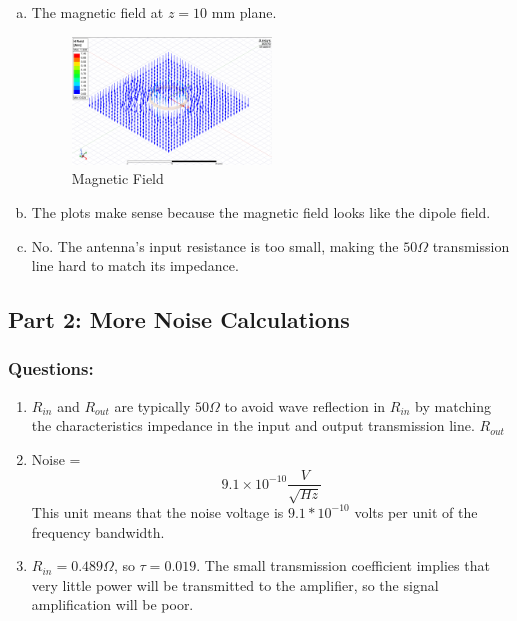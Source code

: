 \documentclass{article} %
\begin{document}
\begin{enumerate}[]
\begin{enumerate}[(a)]
              \item The magnetic field at $z = 10$ mm plane.
                    \begin{figure}[H]
                        \centering
                        \includegraphics[width=0.5\textwidth]{./image/figure9.png}
                        \caption{Magnetic Field}
                    \end{figure}
              \item The plots make sense because the magnetic field looks like the dipole field.
              \item No. The antenna's input resistance is too small, making the $50\Omega$ transmission line hard to match its impedance.
          \end{enumerate}
\end{enumerate}

\subsection*{Part 2: More Noise Calculations}

\subsubsection*{Questions:}
\begin{enumerate}
    \item $R_{in}$ and $R_{out}$ are typically $50 \Omega$ to avoid wave reflection in $R_{in}$ by matching the characteristics impedance in the input and output transmission line. $R_{out}$
    \item Noise =
          \[9.1 \times 10^{-10} \frac{V}{\sqrt{Hz}}\]
          This unit means that the noise voltage is $9.1*10^{-10}$ volts per unit of the frequency bandwidth.
    \item $R_{in} = 0.489 \Omega$, so $\tau = 0.019$. The small transmission coefficient implies that very little power will be transmitted to the amplifier, so the signal amplification will be poor.
\end{enumerate}
\end{document}
